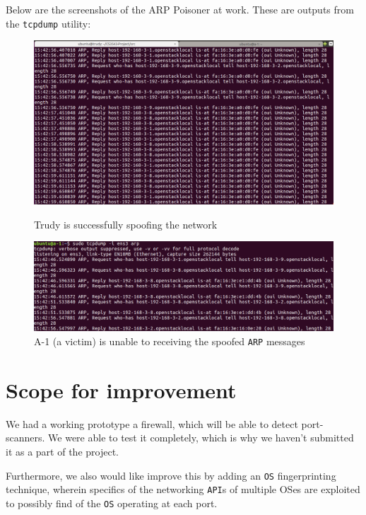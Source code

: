 \documentclass[12pt]{article}
\newcommand{\pbreak}{\vspace{4mm}}
\begin{document}
Below are the screenshots of the ARP Poisoner at work. These are outputs from the \texttt{tcpdump} utility:
\begin{figure}[H]
\begin{minipage}{0.475\linewidth}    
\centering
\includegraphics[width=\textwidth]{trudy-side-sending.png}
\caption{Trudy is successfully spoofing the network}
\end{minipage}
\hfill
\begin{minipage}{0.475\linewidth}    
\centering
\includegraphics[width=\textwidth]{a1-side-receiving.png}
\caption{A-1 (a victim) is unable to receiving the spoofed \texttt{ARP} messages}
\end{minipage}
\end{figure}

\section{Scope for improvement}
We had a working prototype a firewall, which will be able to detect port-scanners. We were able to test it completely, which is why we haven't submitted it as a part of the project.
\pbreak

Furthermore, we also would like improve this by adding an \texttt{OS} fingerprinting technique, wherein specifics of the networking \texttt{API}s of multiple OSes are exploited to possibly find of the \texttt{OS} operating at each port.


\end{document}
